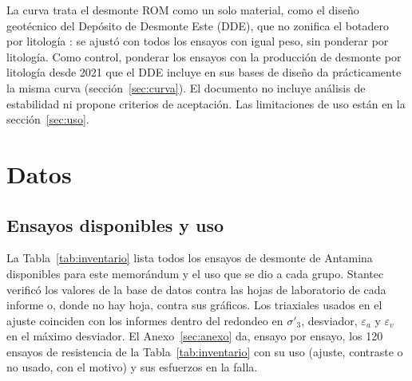 \documentclass[11pt,letterpaper]{article}
\begin{document}
La curva trata el desmonte ROM como un solo material, como el diseño geotécnico del Depósito de Desmonte Este (DDE), que no zonifica el botadero por litología \citep[Tabla~3-1]{stantec2026iff}: se ajustó con todos los ensayos con igual peso, sin ponderar por litología. Como control, ponderar los ensayos con la producción de desmonte por litología desde 2021 que el DDE incluye en sus bases de diseño da prácticamente la misma curva (sección~\ref{sec:curva}). El documento no incluye análisis de estabilidad ni propone criterios de aceptación. Las limitaciones de uso están en la sección~\ref{sec:uso}.

\section{Datos}\label{sec:datos}
\subsection{Ensayos disponibles y uso}
La Tabla~\ref{tab:inventario} lista todos los ensayos de desmonte de Antamina disponibles para este memorándum y el uso que se dio a cada grupo. Stantec verificó los valores de la base de datos contra las hojas de laboratorio de cada informe o, donde no hay hoja, contra sus gráficos. Los triaxiales usados en el ajuste coinciden con los informes dentro del redondeo en $\sigma'_3$, desviador, $\varepsilon_a$ y $\varepsilon_v$ en el máximo desviador. El Anexo~\ref{sec:anexo} da, ensayo por ensayo, los 120 ensayos de resistencia de la Tabla~\ref{tab:inventario} con su uso (ajuste, contraste o no usado, con el motivo) y sus esfuerzos en la falla.
\end{document}
